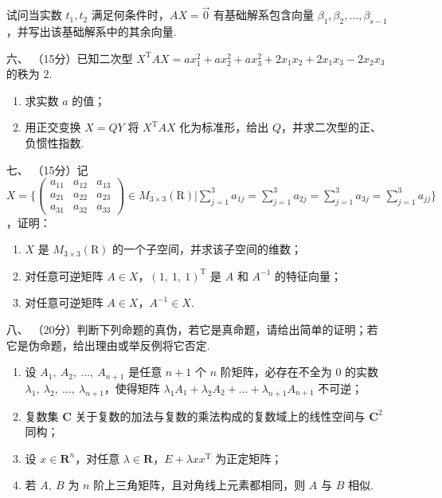 \begin{enumerate}
    试问当实数 $t_1,t_2$ 满足何条件时，$AX=\vec{0}$ 有基础解系包含向量 $\beta_1,\beta_2,\ldots,\beta_{s-1}$，并写出该基础解系中的其余向量.
	\item[六、]（15分）已知二次型 $X^{\mathrm{T}}AX=ax_1^2+ax_2^2+ax_3^2+2x_1x_2+2x_1x_3-2x_2x_3$ 的秩为 $2$.
    \begin{enumerate}[label=(\arabic*)]
        \item 求实数 $a$ 的值；
        \item 用正交变换 $X=QY$ 将 $X^{\mathrm{T}}AX$ 化为标准形，给出 $Q$，并求二次型的正、负惯性指数.
    \end{enumerate}
	\item[七、]（15分）记 $X=\Bigg\{\begin{pmatrix}a_{11} & a_{12} & a_{13} \\ a_{21} & a_{22} & a_{23} \\ a_{31} & a_{32} & a_{33}\end{pmatrix} \in M_{3 \times 3}(\mathrm{R}) \Bigg| \sum\limits_{j=1}^3a_{1j}=\sum\limits_{j=1}^3a_{2j}=\sum\limits_{j=1}^3a_{3j}=\sum\limits_{j=1}^3a_{jj}\Bigg\}$，证明：
    \begin{enumerate}[label=(\arabic*)]
        \item $X$ 是 $M_{3 \times 3}(\mathrm{R})$ 的一个子空间，并求该子空间的维数；
        \item 对任意可逆矩阵 $A \in X$，$(1,\ 1,\ 1)^{\mathrm{T}}$ 是 $A$ 和 $A^{-1}$ 的特征向量；
        \item 对任意可逆矩阵 $A \in X$，$A^{-1} \in X$.
    \end{enumerate}
	\item[八、]（20分）判断下列命题的真伪，若它是真命题，请给出简单的证明；若它是伪命题，给出理由或举反例将它否定.
    \begin{enumerate}[label=(\arabic*)]
        \item 设 $A_1,\ A_2,\ \dots,\ A_{n+1}$ 是任意 $n+1$ 个 $n$ 阶矩阵，必存在不全为 $0$ 的实数 $\lambda_1,\ \lambda_2,\ \dots,\ \lambda_{n+1}$，使得矩阵 $\lambda_1A_1+\lambda_2A_2+\dots+\lambda_{n+1}A_{n+1}$ 不可逆；
        \item 复数集 $\mathbf{C}$ 关于复数的加法与复数的乘法构成的复数域上的线性空间与 $\mathbf{C}^2$ 同构；
        \item 设 $x \in \mathbf{R}^n$，对任意 $\lambda \in \mathbf{R}$，$E+\lambda xx^{\mathrm{T}}$ 为正定矩阵；
        \item 若 $A,\ B$ 为 $n$ 阶上三角矩阵，且对角线上元素都相同，则 $A$ 与 $ B$ 相似.
    \end{enumerate}
\end{enumerate}

\newpage
